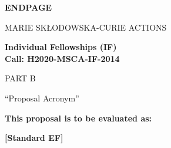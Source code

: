 \documentclass[a4paper,11pt]{article}
\newcommand{\acronym}{{\sc Proposal Acronym}\xspace}
\begin{document}
\newpage
\vspace{15mm}
\begin{center}


        \Large{
      
     
        \textbf{ENDPAGE}
  
          \vspace{15mm}
          MARIE SKŁODOWSKA-CURIE ACTIONS\\
          \vspace{1cm}
          
          \textbf{Individual Fellowships (IF)}\\
          \textbf{Call: H2020-MSCA-IF-2014}
          \vspace{2cm}                   

          PART B
          \vspace{2.5cm}

          ``\acronym''
          \vspace{2cm}

          \textbf{This proposal is to be evaluated as:}
          \vspace{.5cm}

          \textbf{[Standard EF]}
        }

  \end{center}
\vspace{1cm}
\end{document}
